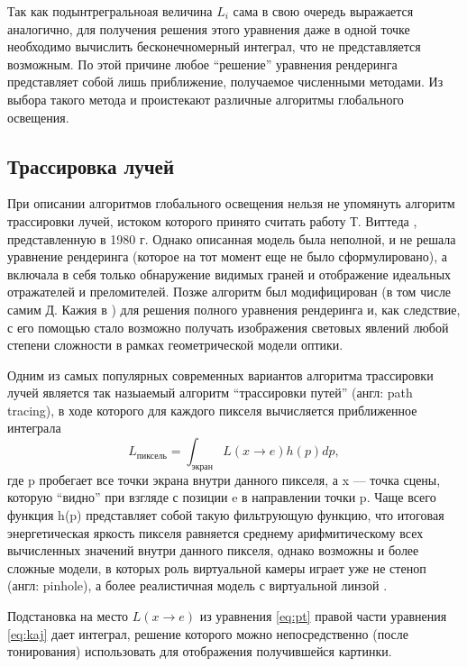 \documentclass[12pt]{article}
\begin{document}
Так как подынтрегральноая величина $L_i$ сама в свою очередь выражается аналогично, для получения решения этого уравнения даже в одной точке необходимо вычислить бесконечномерный интеграл, что не представляется возможным. По этой причине любое ``решение'' уравнения рендеринга представляет собой лишь приближение, получаемое численными методами. Из выбора такого метода и проистекают различные алгоритмы глобального освещения.
\subsection{Трассировка лучей}
При описании алгоритмов глобального освещения нельзя не упомянуть алгоритм трассировки лучей, истоком которого принято считать работу Т. Виттеда \cite{Witt80}, представленную в 1980 г. Однако описанная модель была неполной, и не решала уравнение рендеринга (которое на тот момент еще не было сформулировано), а включала в себя только обнаружение видимых граней и отображение идеальных отражателей и преломителей. Позже алгоритм был модифицирован (в том числе самим Д. Кажия в \cite{Kaj86}) для решения полного уравнения рендеринга и, как следствие, с его помощью стало возможно получать изображения световых явлений любой степени сложности в рамках геометрической модели оптики.

Одним из самых популярных современных вариантов алгоритма трассировки лучей является так назыаемый алгоритм ``трассировки путей'' (англ: path tracing), в ходе которого для каждого пикселя вычисляется приближенное интеграла
\begin{equation}
L_{\text{пиксель}} = \int_{\text{экран}} L(x \rightarrow e) h(p) dp,\label{eq:pt}
\end{equation}
где p пробегает все точки экрана внутри данного пикселя, а x --- точка сцены, которую ``видно'' при взгляде с позиции e в направлении точки p. Чаще всего функция h(p) представляет собой такую фильтрующую функцию, что итоговая энергетическая яркость пикселя равняется среднему арифмитическому всех вычисленных значений внутри данного пикселя, однако возможны и более сложные модели, в которых роль виртуальной камеры играет уже не стеноп (англ: pinhole), а более реалистичная модель с виртуальной линзой \cite{Kolb95}.

Подстановка на место $L(x \rightarrow e)$ из уравнения \eqref{eq:pt} правой части уравнения \eqref{eq:kaj} дает интеграл, решение которого можно непосредственно (после тонирования) использовать для отображения получившейся картинки.
\end{document}
